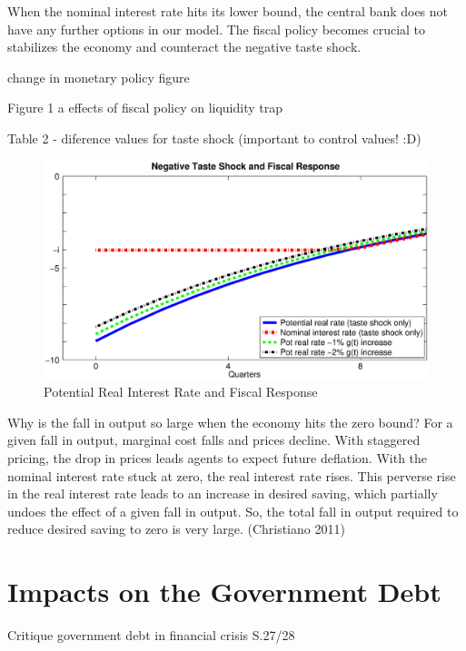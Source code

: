 \documentclass[12pt,a4paper,oneside,titlepage]{article}
\begin{document}
When the nominal interest rate hits its lower bound, the central bank does not have any further options in our model. The fiscal policy becomes crucial to stabilizes the economy and counteract the negative taste shock.

change in monetary policy figure

Figure 1 a effects of fiscal policy on liquidity trap

Table 2 - diference values for taste shock (important to control values! :D)

\begin{figure}[p]
\includegraphics[width=\textwidth]{Paperpics/Figure1a}
\caption{Potential Real Interest Rate and Fiscal Response}
\label{Figure1a}
\end{figure}

Why is the fall in output so large when the economy hits the zero
bound? For a given fall in output, marginal cost falls and prices decline.
With staggered pricing, the drop in prices leads agents to expect future deflation. With the nominal interest rate stuck at zero, the real interest
rate rises. This perverse rise in the real interest rate leads to an increase
in desired saving, which partially undoes the effect of a given fall in
output. So, the total fall in output required to reduce desired saving to
zero is very large. (Christiano 2011)



\section{Impacts on the Government Debt}

\citet{Afonso.2010}
Critique government debt in financial crisis S.27/28


\end{document}
